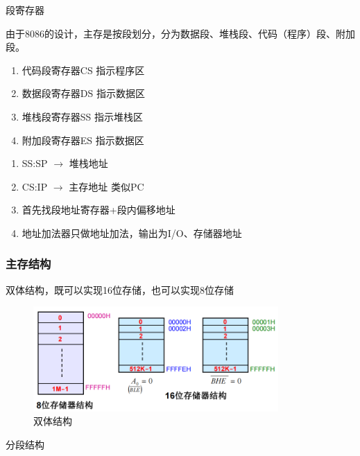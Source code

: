 \documentclass{article}
\begin{document}
段寄存器

由于8086的设计，主存是按段划分，分为数据段、堆栈段、代码（程序）段、附加段。

\begin{enumerate}
    \item 代码段寄存器CS  指示程序区
    \item 数据段寄存器DS 指示数据区
    \item 堆栈段寄存器SS 指示堆栈区
    \item 附加段寄存器ES 指示数据区
\end{enumerate}

\begin{enumerate}
    \item SS:SP $\rightarrow$ 堆栈地址
    \item CS:IP $\rightarrow$ 主存地址 类似PC
    \item 首先找段地址寄存器+段内偏移地址
    \item 地址加法器只做地址加法，输出为I/O、存储器地址
\end{enumerate}



\newpage

\subsubsection{主存结构}

双体结构，既可以实现16位存储，也可以实现8位存储

\begin{figure}[H]
    \centering
    \includegraphics[height=4cm]{img/2.1-4.png}
    \caption{双体结构}
\end{figure}

分段结构
\end{document}
